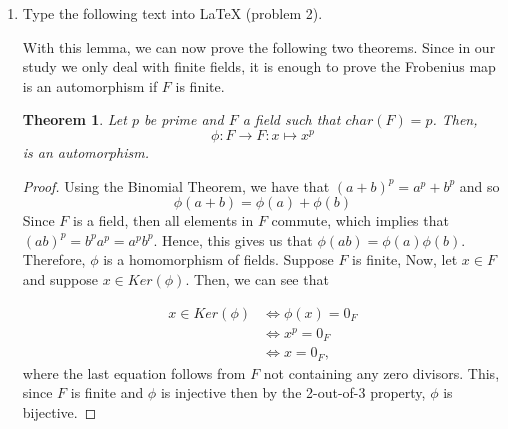 \documentclass[11pt]{amsart}
\newtheorem{theorem}{Theorem}
\begin{document}
\begin{enumerate}
\begin{proof}
We provide a proof by contradiction, let $x_i$ be a vertex of $C_{14}$ and assume that the Heawood graph contains a cycle of odd length, denoted by $C = x_1 x_2 \ldots x_k x_1$. Since $C$ is an odd-length cycle, then $k$ must be odd. Since the Heawood graph is bipartite, then all vertices can be partitioned into two disjoint and pairwise non-adjacent sets $U,V$. Since $x_i$ and $x_{i+1}$ are adjacent, without loss of generality, suppose that $x_i \in U$ and $x_{i+1} \in V$, for all $i$ odd. Hence $\lbrace x_1, x_3, \ldots , x_k \rbrace \subseteq U$ and $\lbrace x_2, x_4, \ldots, x_{k-1} \rbrace \subseteq V$. Note that $x_k, x_1$ are adjacent in $C$, but $x_1$ and $x_k$ are both in $U$, contradicting that $U$ is pairwise non-adjacent. Thus the Heawood graph does not contain a cycle of odd length.
\end{proof}

\newpage

\item Type the following text into LaTeX (problem 2).

\vspace{.3in}

With this lemma, we can now prove the following two theorems. Since in our study we only deal with finite fields, it is enough to prove the Frobenius map is an automorphism if $F$ is finite.

\begin{theorem}
Let $p$ be prime and $F$ a field such that $char\left(F\right) = p$. Then, 
\[
	\phi : F \to F : x \mapsto x^p
\]
is an automorphism.
\end{theorem}

\begin{proof}
Using the Binomial Theorem, we have that $\left(a + b\right)^p = a^p + b^p$ and so
\[
	\phi\left(a + b\right) = \phi\left(a\right) + \phi\left(b\right)
\]
Since $F$ is a field, then all elements in $F$ commute, which implies that $\left(ab\right)^p = b^p a^p = a^p b^p$. Hence, this gives us that $\phi\left(ab\right) = \phi\left(a\right) \phi\left(b\right)$. Therefore, $\phi$ is a homomorphism of fields. Suppose $F$ is finite, Now, let $x \in F$ and suppose $x \in Ker \left(\phi\right)$. Then, we can see that

\begin{align*}
	x \in Ker\left(\phi\right) &\iff \phi\left(x\right) = 0_{F} \\
							   &\iff x^p = 0_F \\
							   &\iff x = 0_F ,
\end{align*}
where the last equation follows from $F$ not containing any zero divisors. This, since $F$ is finite and $\phi$ is injective then by the 2-out-of-3 property, $\phi$ is bijective.
\end{proof}


\end{enumerate}
\end{document}
